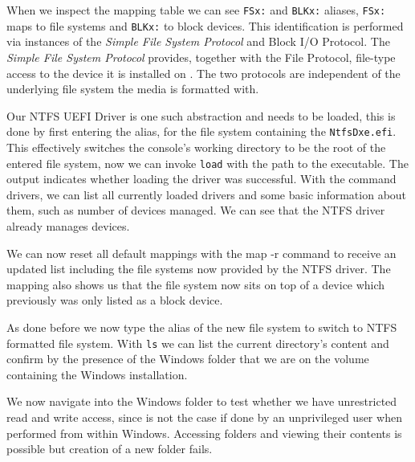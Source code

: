 When we inspect the mapping table we can see \lstinline{FSx:} and \lstinline{BLKx:} aliases, \lstinline{FSx:} maps to file systems and \lstinline{BLKx:} to block devices. This identification is performed via instances of the \emph{Simple File System Protocol} and  Block I/O Protocol.
The \emph{Simple File System Protocol} \cite[13.4 Simple File System Protocol]{uefi-spec} provides, together with the File Protocol, file-type access to the device it is installed on \cite[13.5 File Protocol]{uefi-spec}. The two protocols are independent of the underlying file system the media is formatted with.


Our \ac{NTFS} \ac{UEFI} Driver is one such abstraction and needs to be loaded, this is done by first entering the alias, for the file system containing the \lstinline{NtfsDxe.efi}.
This effectively switches the console's working directory to be the root of the entered file system, now we can invoke \lstinline{load} with the path to the executable. The output indicates whether loading the driver was successful.
With the command drivers, we can list all currently loaded drivers and some basic information about them, such as number of devices managed. We can see that the NTFS driver already manages devices.

We can now reset all default mappings with the map -r command to receive an updated list including the file systems now provided by the \ac{NTFS} driver. The mapping also shows us that the file system now sits on top of a device which previously was only listed as a block device.

As done before we now type the alias of the new file system to switch to NTFS formatted file system. With \lstinline{ls} we can list the current directory's content and confirm by the presence of the Windows folder that we are on the volume containing the Windows installation.


We now navigate into the Windows folder to test whether we have unrestricted read and write access, since is not the case if done by an unprivileged user when performed from within Windows. Accessing folders and viewing their contents is possible but creation of a new folder fails.

